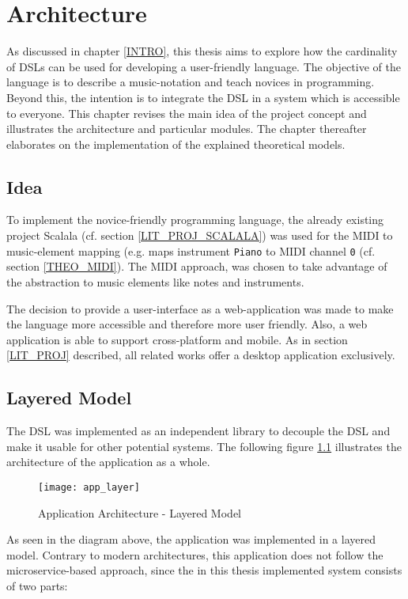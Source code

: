 \chapter{Architecture}
\label{ARCH}
As discussed in chapter \ref{INTRO}, this thesis aims to explore how the cardinality of DSLs can be used for developing a user-friendly language. The objective of the language is to describe a music-notation and teach novices in programming. Beyond this, the intention is to integrate the DSL in a system which is accessible to everyone. This chapter revises the main idea of the project concept and illustrates the architecture and particular modules. The chapter thereafter elaborates on the implementation of the explained theoretical models.

\section{Idea}
\label{ARCH_IDEA}
To implement the novice-friendly programming language, the already existing project Scalala (cf. section \ref{LIT_PROJ_SCALALA}) was used for the MIDI to music-element mapping (e.g. maps instrument \texttt{Piano} to MIDI channel \texttt{0} (cf. section \ref{THEO_MIDI}). The MIDI approach, was chosen to take advantage of the abstraction to music elements like notes and instruments.

The decision to provide a user-interface as a web-application was made to make the language more accessible and therefore more user friendly. Also, a web application is able to support cross-platform and mobile. As in section \ref{LIT_PROJ} described, all related works offer a desktop application exclusively.

\section{Layered Model}
\label{ARCH_LAYER}
The DSL was implemented as an independent library to decouple the DSL and make it usable for other potential systems. The following figure \ref{IMG_LAYER_ARCH} illustrates the architecture of the application as a whole.

\begin{figure}[h]
\caption{Application Architecture - Layered Model}
\label{IMG_LAYER_ARCH}
\texttt{[image: app\_layer]}
\end{figure}

As seen in the diagram above, the application was implemented in a layered model. Contrary to modern architectures, this application does not follow the microservice-based approach, since the in this thesis implemented system consists of two parts:


